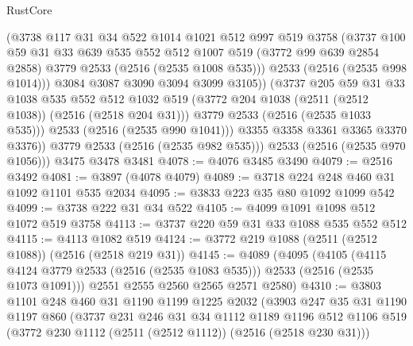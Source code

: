 \begin{lexlean}{RustCore}
\begin{coremodule}
                  (@3738
                    @117
                    @31
                    @34
                    @522
                    @1014
                    @1021
                    @512
                    @997
                    @519
                    @3758
                    (@3737
                      @100
                      @59
                      @31
                      @33
                      @639
                      @535
                      @552
                      @512
                      @1007
                      @519
                      (@3772 @99 @639 @2854 @2858)
                      @3779
                      @2533
                      (@2516 (@2535 @1008 @535)))
                    @2533
                    (@2516 (@2535 @998 @1014)))
                  @3084
                  @3087
                  @3090
                  @3094
                  @3099
                  @3105))
              (@3737
                @205
                @59
                @31
                @33
                @1038
                @535
                @552
                @512
                @1032
                @519
                (@3772 @204 @1038 (@2511 (@2512 @1038)) (@2516 (@2518 @204 @31)))
                @3779
                @2533
                (@2516 (@2535 @1033 @535)))
              @2533
              (@2516 (@2535 @990 @1041)))
            @3355
            @3358
            @3361
            @3365
            @3370
            @3376))
        @3779
        @2533
        (@2516 (@2535 @982 @535)))
      @2533
      (@2516 (@2535 @970 @1056)))
    @3475
    @3478
    @3481
@4078 := @4076 @3485 @3490
@4079 := @2516 @3492
@4081 := @3897 (@4078 @4079)
@4089 := @3718 @224 @248 @460 @31 @1092 @1101 @535 @2034
@4095 := @3833 @223 @35 @80 @1092 @1099 @542
@4099 := @3738 @222 @31 @34 @522
@4105 := @4099 @1091 @1098 @512 @1072 @519 @3758
@4113 := @3737 @220 @59 @31 @33 @1088 @535 @552 @512
@4115 := @4113 @1082 @519
@4124 := @3772 @219 @1088 (@2511 (@2512 @1088)) (@2516 (@2518 @219 @31))
@4145 := @4089
    (@4095
      (@4105 (@4115 @4124 @3779 @2533 (@2516 (@2535 @1083 @535))) @2533 (@2516 (@2535 @1073 @1091)))
      @2551
      @2555
      @2560
      @2565
      @2571
      @2580)
@4310 := @3803
    @1101
    @248
    @460
    @31
    @1190
    @1199
    @1225
    @2032
    (@3903
      @247
      @35
      @31
      @1190
      @1197
      @860
      (@3737
        @231
        @246
        @31
        @34
        @1112
        @1189
        @1196
        @512
        @1106
        @519
        (@3772 @230 @1112 (@2511 (@2512 @1112)) (@2516 (@2518 @230 @31)))

\end{coremodule}
\end{lexlean}

